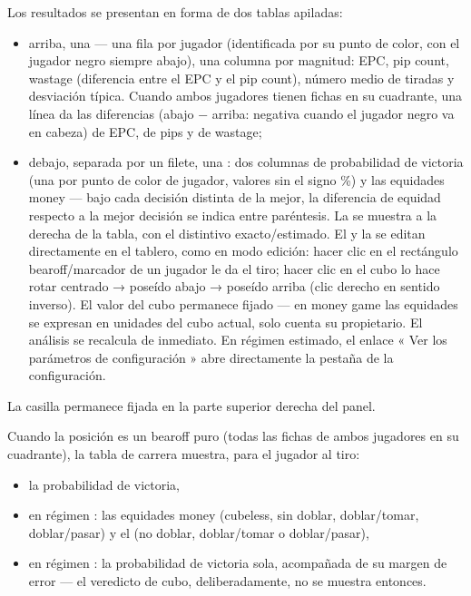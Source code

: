 \documentclass[letterpaper,10pt,spanish]{sphinxmanual}
\begin{document}
\sphinxAtStartPar
Los resultados se presentan en forma de dos tablas apiladas:
\begin{itemize}
\item {} 
\sphinxAtStartPar
arriba, una  — una fila por jugador (identificada por su punto de color, con el jugador negro siempre abajo), una columna por magnitud: EPC, pip count, wastage (diferencia entre el EPC y el pip count), número medio de tiradas y desviación típica. Cuando ambos jugadores tienen fichas en su cuadrante, una línea  da las diferencias  (abajo − arriba: negativa cuando el jugador negro va en cabeza) de EPC, de pips y de wastage;

\item {} 
\sphinxAtStartPar
debajo, separada por un filete, una : dos columnas de probabilidad de victoria (una por punto de color de jugador, valores sin el signo \%) y las equidades money — bajo cada decisión distinta de la mejor, la diferencia de equidad respecto a la mejor decisión se indica entre paréntesis. La  se muestra a la derecha de la tabla, con el distintivo exacto/estimado. El  y la  se editan directamente en el tablero, como en modo edición: hacer clic en el rectángulo bearoff/marcador de un jugador le da el tiro; hacer clic en el cubo lo hace rotar centrado → poseído abajo → poseído arriba (clic derecho en sentido inverso). El valor del cubo permanece fijado — en money game las equidades se expresan en unidades del cubo actual, solo cuenta su propietario. El análisis se recalcula de inmediato. En régimen estimado, el enlace « Ver los parámetros de configuración » abre directamente la pestaña  de la configuración.

\end{itemize}

\sphinxAtStartPar
La casilla  permanece fijada en la parte superior derecha del panel.

\sphinxAtStartPar
Cuando la posición es un bearoff puro (todas las fichas de ambos jugadores en su cuadrante), la tabla de carrera muestra, para el jugador al tiro:
\begin{itemize}
\item {} 
\sphinxAtStartPar
la probabilidad de victoria,

\item {} 
\sphinxAtStartPar
en régimen : las equidades money (cubeless, sin doblar, doblar/tomar, doblar/pasar) y el  (no doblar, doblar/tomar o doblar/pasar),

\item {} 
\sphinxAtStartPar
en régimen : la probabilidad de victoria sola, acompañada de su margen de error — el veredicto de cubo, deliberadamente, no se muestra entonces.

\end{itemize}
\end{document}
